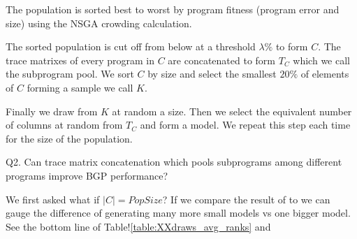 \begin{inparaenum}
\item The population is sorted best to worst by program fitness (program error and size) using the NSGA crowding calculation.

\item The sorted population is cut off from below at a threshold $\lambda \%$ to form $C$.  The trace matrixes of every program in $C$ are concatenated to form $T_C$ which we call the subprogram pool.  We sort $C$ by size and select the smallest $20\%$ of elements of $C$ forming a sample we call $K$.
   
\item Finally we draw from $K$ at random a size. Then we select the equivalent number of columns at random from $T_C$ and form a model. We repeat this step each time for the size of the population.

\end{inparaenum}

\noindent Q2. Can trace matrix concatenation which pools subprograms among different programs improve BGP performance?


%





We first asked what if $|C| = PopSize$?  If we compare the result of \DRAW to \FULL we can gauge the difference of generating many more small models vs one bigger model.   See the bottom line of Table!\ref{table:XXdraws_avg_ranks} and 

%
%
%
%
%

%
